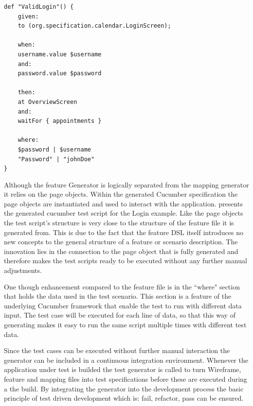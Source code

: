 \documentclass{sig-alternate-05-2015}
\begin{document}
\begin{lstlisting}[captionpos=b, caption=Generated Feature File, label={lst:featureGenerated}, language=dsl]
	def "ValidLogin"() {
	given:
	to (org.specification.calendar.LoginScreen);
	
	when:
	username.value $username
	and:
	password.value $password
	
	then:
	at OverviewScreen
	and:
	waitFor { appointments }
	
	where:
	$password | $username
	"Password" | "johnDoe"
}
\end{lstlisting}

Although the feature Generator is logically separated from the mapping generator it relies on the page objects.
Within the generated Cucumber specification the page objects are instantiated and used to interact with the application.
 presents the generated cucumber test script for the Login example. 
Like the page objects the test script's structure is very close to the structure of the feature file it is generated from.
This is due to the fact that the feature DSL itself introduces no new concepts to the general structure of a feature or scenario description.
The innovation lies in the connection to the page object that is fully generated and therefore makes the test scripts ready to be executed without any further manual adjustments.

One though enhancement compared to the feature file is in the ``where" section that holds the data used in the test scenario.
This section is a feature of the underlying Cucumber framework that enable the test to run with different data input. 
The test case will be executed for each line of data, so that this way of generating makes it easy to run the same script multiple times with different test data.

Since the test cases can be executed without further manual interaction the generator can be included in a continuous integration environment.
Whenever the application under test is builded the test generator is called to turn Wireframe, feature and mapping files into test specifications before these are executed during a the build.
By integrating the generator into the development process the basic principle of test driven development which is: fail, refactor, pass can be ensured.

\end{document}
